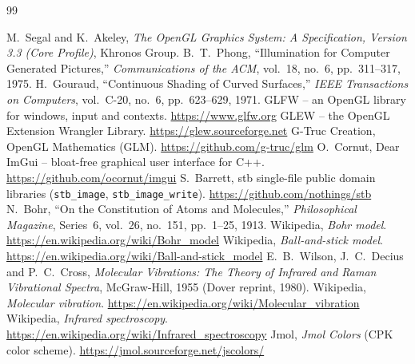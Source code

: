 \documentclass[a4paper, 11pt]{article}
\newcommand{\code}[1]{\texttt{#1}}
\begin{document}
\pagebreak
\begin{thebibliography}{99}
 M.~Segal and K.~Akeley, \emph{The OpenGL Graphics System: A Specification, Version 3.3 (Core Profile)}, Khronos Group.
 B.~T.~Phong, ``Illumination for Computer Generated Pictures,'' \emph{Communications of the ACM}, vol.~18, no.~6, pp.~311--317, 1975.
 H.~Gouraud, ``Continuous Shading of Curved Surfaces,'' \emph{IEEE Transactions on Computers}, vol.~C-20, no.~6, pp.~623--629, 1971.
 GLFW -- an OpenGL library for windows, input and contexts. \url{https://www.glfw.org}
 GLEW -- the OpenGL Extension Wrangler Library. \url{https://glew.sourceforge.net}
 G-Truc Creation, OpenGL Mathematics (GLM). \url{https://github.com/g-truc/glm}
 O.~Cornut, Dear ImGui -- bloat-free graphical user interface for C++. \url{https://github.com/ocornut/imgui}
 S.~Barrett, stb single-file public domain libraries (\code{stb\_image}, \code{stb\_image\_write}). \url{https://github.com/nothings/stb}
 N.~Bohr, ``On the Constitution of Atoms and Molecules,'' \emph{Philosophical Magazine}, Series~6, vol.~26, no.~151, pp.~1--25, 1913.
 Wikipedia, \emph{Bohr model}. \url{https://en.wikipedia.org/wiki/Bohr_model}
 Wikipedia, \emph{Ball-and-stick model}. \url{https://en.wikipedia.org/wiki/Ball-and-stick_model}
 E.~B.~Wilson, J.~C.~Decius and P.~C.~Cross, \emph{Molecular Vibrations: The Theory of Infrared and Raman Vibrational Spectra}, McGraw-Hill, 1955 (Dover reprint, 1980).
 Wikipedia, \emph{Molecular vibration}. \url{https://en.wikipedia.org/wiki/Molecular_vibration}
 Wikipedia, \emph{Infrared spectroscopy}. \url{https://en.wikipedia.org/wiki/Infrared_spectroscopy}
 Jmol, \emph{Jmol Colors} (CPK color scheme). \url{https://jmol.sourceforge.net/jscolors/}
\end{thebibliography}
\end{document}
